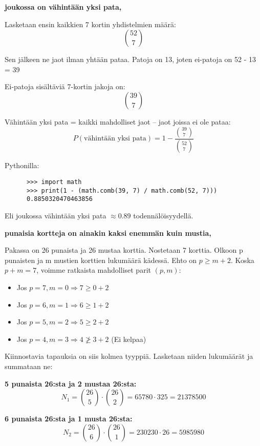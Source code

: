 \documentclass[12pt,a4paper]{article}
\begin{document}
\begin{kohta}
  \item \textbf{joukossa on vähintään yksi pata,}

  Lasketaan ensin kaikkien 7 kortin yhdistelmien määrä:
  \[
  \binom{52}{7}
  \]

  Sen jälkeen ne jaot ilman yhtään pataa.
  Patoja on 13, joten ei-patoja on 52 - 13 = 39

  Ei-patoja sisältäviä 7-kortin jakoja on:
  \[
  \binom{39}{7}
  \]

  Vähintään yksi pata = kaikki mahdolliset jaot – jaot joissa ei ole pataa:
  \[
  P(\text{vähintään yksi pata}) = 1 - \frac{\binom{39}{7}}{\binom{52}{7}}
  \]

  Pythonilla:
    \begin{verbatim}
      >>> import math
      >>> print(1 - (math.comb(39, 7) / math.comb(52, 7)))
      0.8850320470463856
    \end{verbatim}

    Eli joukossa vähintään yksi pata $\approx 0.89$ todennälöisyydellä.






\pagebreak
  \item \textbf{punaisia kortteja on ainakin kaksi enemmän kuin mustia,}

  
Pakassa on 26 punaista ja 26 mustaa korttia. Nostetaan 7 korttia. Olkoon p punaisten ja m mustien korttien lukumäärä kädessä.
Ehto on $p \ge m + 2$. Koska $p+m=7$, voimme ratkaista mahdolliset parit $(p, m)$:
\begin{itemize}
    \item Jos $p=7, m=0 \Rightarrow 7 \ge 0+2$
    \item Jos $p=6, m=1 \Rightarrow 6 \ge 1+2$
    \item Jos $p=5, m=2 \Rightarrow 5 \ge 2+2$
    \item Jos $p=4, m=3 \Rightarrow 4 \not\ge 3+2$ (Ei kelpaa)
  \end{itemize}
Kiinnostavia tapauksia on siis kolmea tyyppiä. Lasketaan niiden lukumäärät ja summataan ne:

\begin{alakohta}
    \item \textbf{5 punaista 26:sta ja 2 mustaa 26:sta:} \\
    \[ N_1 = \binom{26}{5} \cdot \binom{26}{2} = 65780 \cdot 325 = 21378500 \]

    \item \textbf{6 punaista 26:sta ja 1 musta 26:sta:} \\
    \[ N_2 = \binom{26}{6} \cdot \binom{26}{1} = 230230 \cdot 26 = 5985980 \]


\end{alakohta}
\end{kohta}
\end{document}
